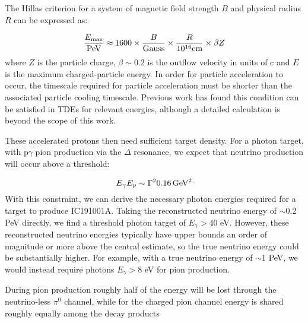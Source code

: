 The Hillas criterion\cite{1984ARA&A..22..425H} for a system of magnetic field strength $B$ and physical radius $R$ can be expressed as\cite{1984ARA&A..22..425H}:

\begin{equation}
\frac{E_{\textup{max}}}{\textup{PeV}} \approx
1600 \times \frac{B}{\textup{Gauss}} \times \frac{R}{10^{16} \textup{cm}} \times
\beta Z
\end{equation}
where $Z$ is the particle charge, $\beta \sim 0.2$ is the outflow velocity in units of c and $E$ is the maximum charged-particle energy. In order for particle acceleration to occur, the timescale required for particle acceleration must be shorter than the associated particle cooling timescale. Previous work has found this condition can be satisfied in TDEs for relevant energies\cite{2017ApJ...838....3S, 2017PhRvD..95l3001L}, although a detailed calculation is beyond the scope of this work.

These accelerated protons then need sufficient target density. For a photon target, with p$\gamma$ pion production via the $\Delta$ resonance, we expect that neutrino production will occur above a threshold:

\begin{equation}
E_{\gamma}E_{p} \sim \Gamma ^{2} 0.16 \, \textup{GeV}^{2}
\end{equation} With this constraint, we can derive the necessary photon energies required for a target to produce IC191001A. Taking the reconstructed neutrino energy of $\sim$0.2 PeV directly, we find a threshold photon target of $E_{\gamma} > $40 eV. However, these reconstructed neutrino energies typically have upper bounds an order of magnitude or more above the central estimate\cite{2018Sci...361.1378I}, so the true neutrino energy could be substantially higher. For example, with a true neutrino energy of $\sim$1 PeV, we would instead require photons $E_{\gamma} > $8 eV for pion production.

During pion production roughly half of the energy will be lost through the neutrino-less $\pi^{0}$ channel\cite{2010ApJ...721..630H}, while for the charged pion channel energy is shared roughly equally among the decay products 


